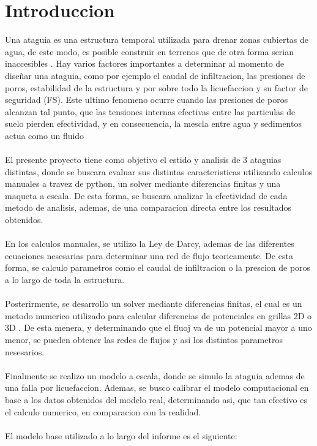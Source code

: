 \section*{Introduccion}

Una ataguia es una estructura temporal utilizada para drenar zonas cubiertas de agua, de este modo, es posible construir en terrenos
que de otra forma serian inaccesibles \textbf{\cite{madanayaka2018}}. Hay varios factores importantes a determinar al momento de diseñar
una ataguia, como por ejemplo el caudal de infiltracion, las presiones de poros, estabilidad de la estructura y por sobre todo la licuefaccion
y su factor de seguridad (FS). Este ultimo fenomeno ocurre cuando las presiones de poros alcanzan tal punto, que las tensiones internas efectivas
entre las particulas de suelo pierden efectividad, y en consecuencia, la mescla entre agua y sedimentos actua como un fluido \textbf{\cite{sumer2009}}
\\ \\
El presente proyecto tiene como objetivo el estido y analisis de 3 ataguias distintas, donde se buscara evaluar sus distintas caracteristicas utilizando 
calculos manuales a travez de python, un solver mediante diferencias finitas y una maqueta a escala. De esta forma, se buscara analizar la efectividad
de cada metodo de analisis, ademas, de una comparacion directa entre los resultados obtenidos.
\\ \\
En los calculos manuales, se utilizo la Ley de Darcy, ademas de las diferentes ecuaciones nesesarias para determinar una red de flujo teoricamente. De esta forma, 
se calculo parametros como el caudal de infiltracion o la prescion de poros a lo largo de toda la estructura.
\\ \\
Posterirmente, se desarrollo un solver mediante diferencias finitas, el cual es un metodo numerico utilizado para calcular diferencias de potenciales en grillas 2D o 3D \textbf{\cite{zhang2005}}.
De esta menera, y determinando que el fluoj va de un potencial mayor a uno menor, se pueden obtener las redes de flujos y asi los distintos parametros nesesarios.
\\ \\
Finalmente se realizo un modelo a escala, donde se simulo la ataguia ademas de una falla por licuefaccion. Ademas, se busco calibrar el modelo computacional en base a los datos obtenidos del modelo real, 
determinando asi, que tan efectivo es el calculo numerico, en comparacion con la realidad.
\\ \\
El modelo base utilizado a lo largo del informe es el siguiente:

